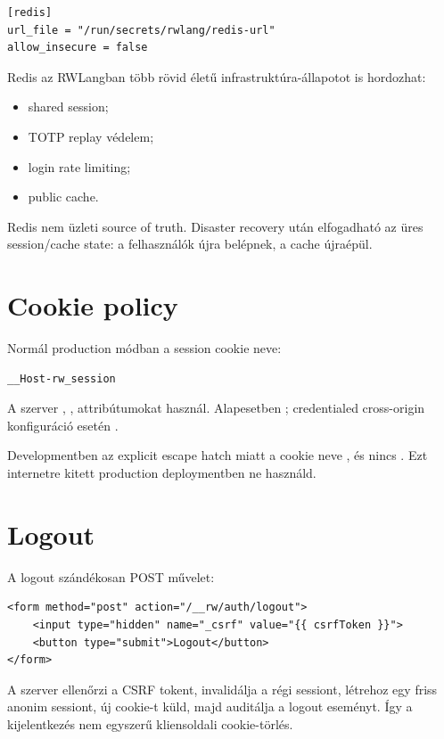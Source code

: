 \begin{lstlisting}
[redis]
url_file = "/run/secrets/rwlang/redis-url"
allow_insecure = false
\end{lstlisting}

Redis az RWLangban több rövid életű infrastruktúra-állapotot is hordozhat:

\begin{itemize}
  \item shared session;
  \item TOTP replay védelem;
  \item login rate limiting;
  \item public cache.
\end{itemize}

Redis nem üzleti source of truth. Disaster recovery után elfogadható az üres session/cache state: a felhasználók újra belépnek, a cache újraépül.

\section{Cookie policy}

Normál production módban a session cookie neve:

\begin{lstlisting}
__Host-rw_session
\end{lstlisting}

A szerver , ,  attribútumokat használ. Alapesetben ; credentialed cross-origin konfiguráció esetén .

Developmentben az explicit  escape hatch miatt a cookie neve , és nincs . Ezt internetre kitett production deploymentben ne használd.

\section{Logout}

A logout szándékosan POST művelet:

\begin{lstlisting}[language=RWLang]
<form method="post" action="/__rw/auth/logout">
    <input type="hidden" name="_csrf" value="{{ csrfToken }}">
    <button type="submit">Logout</button>
</form>
\end{lstlisting}

A szerver ellenőrzi a CSRF tokent, invalidálja a régi sessiont, létrehoz egy friss anonim sessiont, új cookie-t küld, majd auditálja a logout eseményt. Így a kijelentkezés nem egyszerű kliensoldali cookie-törlés.

